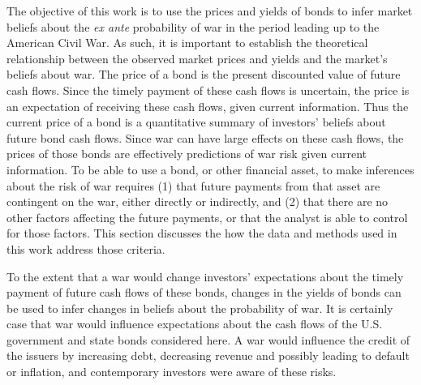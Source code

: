 The objective of this work is to use the prices and yields of bonds to infer market beliefs about the \textit{ex ante} probability of war in the period leading up to the American Civil War.
As such, it is important to establish the theoretical relationship between the observed market prices and yields and the market's beliefs about war.
The price of a bond is the present discounted value of future cash flows.
Since the timely payment of these cash flows is uncertain, the price is an expectation of receiving these cash flows, given current information.
Thus the current price of a bond is a quantitative summary of investors' beliefs about future bond cash flows.
Since war can have large effects on these cash flows, the prices of those bonds are effectively predictions of war risk given current information.
To be able to use a bond, or other financial asset, to make inferences about the risk of war requires (1) that future payments from that asset are contingent on the war, either directly or indirectly, and (2) that there are no other factors affecting the future payments, or that the analyst is able to control for those factors.
This section discusses the how the data and methods used in this work address those criteria.

To the extent that a war would change investors' expectations about the timely payment of future cash flows of these bonds, changes in the yields of bonds can be used to infer changes in beliefs about the probability of war.
It is certainly case that war would influence expectations about the cash flows of the U.S. government and state bonds considered here.
A war would influence the credit of the issuers by increasing debt, decreasing revenue and possibly leading to default or inflation, and contemporary investors were aware of these risks.

